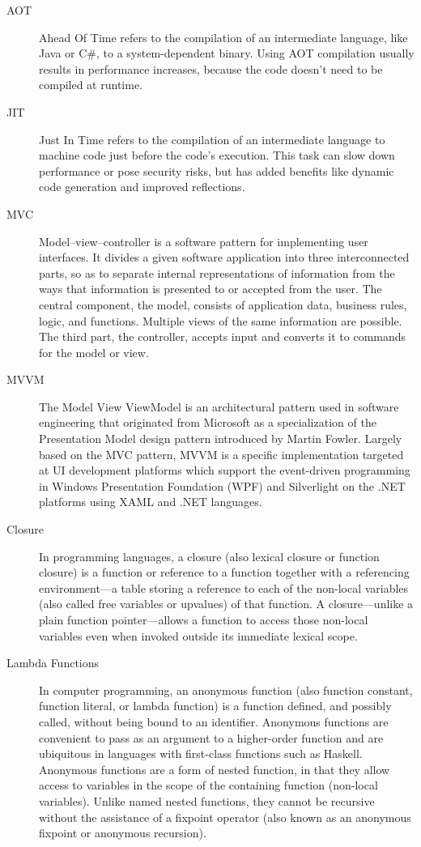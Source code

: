 \begin{description}

\item[AOT] Ahead Of Time refers to the compilation of an intermediate language, like Java or C\#, to a system-dependent binary. Using AOT compilation usually results in performance increases, because the code doesn't need to be compiled at runtime.  

\item[JIT] Just In Time refers to the compilation of an intermediate language to machine code just before the code's execution. This task can slow down performance or pose security risks, but has added benefits like dynamic code generation and improved reflections.

\item[MVC] Model–view–controller is a software pattern for implementing user interfaces. It divides a given software application into three interconnected parts, so as to separate internal representations of information from the ways that information is presented to or accepted from the user. The central component, the model, consists of application data, business rules, logic, and functions. Multiple views of the same information are possible. The third part, the controller, accepts input and converts it to commands for the model or view.

\item[MVVM] The Model View ViewModel is an architectural pattern used in software engineering that originated from Microsoft as a specialization of the Presentation Model design pattern introduced by Martin Fowler. Largely based on the \ac{MVC} pattern, MVVM is a specific implementation targeted at UI development platforms which support the event-driven programming in Windows Presentation Foundation (WPF) and Silverlight on the .NET platforms using XAML and .NET languages.

\item[Closure] In programming languages, a closure (also lexical closure or function closure) is a function or reference to a function together with a referencing environment—a table storing a reference to each of the non-local variables (also called free variables or upvalues) of that function. A closure—unlike a plain function pointer—allows a function to access those non-local variables even when invoked outside its immediate lexical scope.

\item[Lambda Functions] In computer programming, an anonymous function (also function constant, function literal, or lambda function) is a function defined, and possibly called, without being bound to an identifier. Anonymous functions are convenient to pass as an argument to a higher-order function and are ubiquitous in languages with first-class functions such as Haskell. Anonymous functions are a form of nested function, in that they allow access to variables in the scope of the containing function (non-local variables). Unlike named nested functions, they cannot be recursive without the assistance of a fixpoint operator (also known as an anonymous fixpoint or anonymous recursion).
\end{description}

